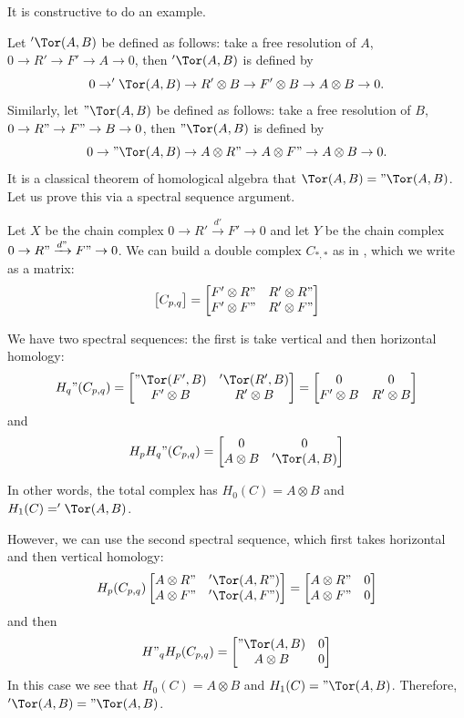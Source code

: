 \documentclass[ma3408.tex]{subfiles}
\begin{document}
It is constructive to do an example. 
\begin{Exa}
Let $'\Tor(A,B)$ be defined as follows: take a free resolution of $A$, $0 \to R' \to F' \to A \to 0$, then $'\Tor(A,B)$ is defined by
\[
0 \to '\Tor(A,B) \to R' \otimes B \to F' \otimes B \to A \otimes B \to 0. 
\]
Similarly, let $"\Tor(A,B)$ be defined as follows: take a free resolution of $B$, $0 \to R" \to F" \to B \to 0$, then $"\Tor(A,B)$ is defined by
\[
0 \to "\Tor(A,B) \to A \otimes R" \to A \otimes F" \to A \otimes B \to 0. 
\]
It is a classical theorem of homological algebra that $\Tor(A,B) = "\Tor(A,B)$. Let us prove this via a spectral sequence argument. 

Let $X$ be the chain complex $0 \to R' \xrightarrow{d'} F' \to 0$ and let $Y$ be the chain complex $0 \to R" \xrightarrow{d"}  F" \to 0$. We can build a double complex $C_{*,*}$ as in , which we write as a matrix:
\[
\begin{bmatrix}C_{p,q}\end{bmatrix} =  \begin{bmatrix}
F' \otimes R" & R' \otimes R" \\
F' \otimes F" & R' \otimes F" 
\end{bmatrix}  
\]

We have two spectral sequences: the first is take vertical and then horizontal homology:
\[
H_q"(C_{p,q})=  \begin{bmatrix}
"\Tor(F',B) & '\Tor(R',B) \\
F' \otimes B & R' \otimes B
\end{bmatrix}  = \begin{bmatrix}
0 & 0 \\
F' \otimes B & R' \otimes B
\end{bmatrix} 
\]
and
\[
H_pH_q"(C_{p,q}) =  \begin{bmatrix}
0 & 0 \\
A \otimes B & '\Tor(A,B)
\end{bmatrix}
\]

In other words, the total complex has $H_0(C) = A \otimes B$ and $H_1(C) = '\Tor(A,B)$. 

However, we can use the second spectral sequence, which first takes horizontal and then vertical homology: 
\[
H_p(C_{p,q})  \begin{bmatrix}
A \otimes R" & '\Tor(A,R") \\
A \otimes F" & '\Tor(A,F")
\end{bmatrix}  = \begin{bmatrix}
A \otimes R" & 0 \\
A \otimes F" & 0
\end{bmatrix} 
\]
and then
\[
H"_qH_p(C_{p,q}) =  \begin{bmatrix}
"\Tor(A,B) & 0 \\
A \otimes B & 0
\end{bmatrix} \]
In this case we see that $H_0(C) = A \otimes B$ and $H_1(C) = "\Tor(A,B)$. Therefore, $'\Tor(A,B) = "\Tor(A,B)$. 
\end{Exa}
\end{document}
